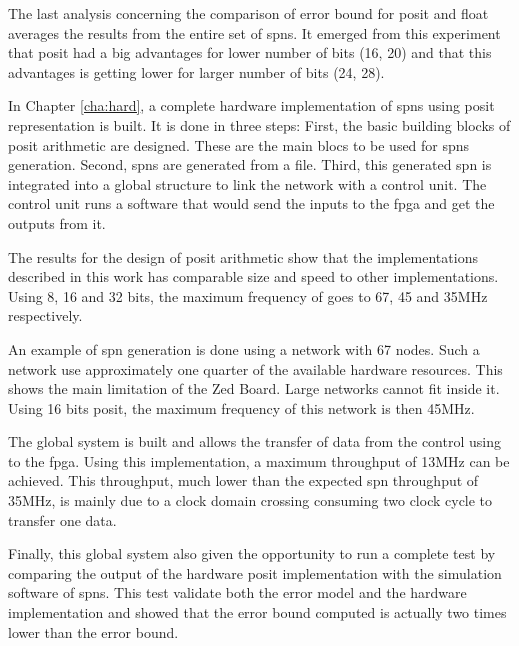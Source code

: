 The last analysis concerning the comparison of error bound for posit and float averages the results from the entire set of \glspl{spn}. It emerged from this experiment that posit had a big advantages for lower number of bits (16, 20) and that this advantages is getting lower for larger number of bits (24, 28).

\vspace{0.5cm}

In Chapter \ref{cha:hard}, a complete hardware implementation of \glspl{spn} using posit representation is built. It is done in three steps: First, the basic building blocks of posit arithmetic are designed. These are the main blocs to be used for \glspl{spn} generation. Second, \glspl{spn} are generated from a file. Third, this generated \gls{spn} is integrated into a global structure to link the network with a control unit. The control unit runs a software that would send the inputs to the \gls{fpga} and get the outputs from it.

The results for the design of posit arithmetic show that the implementations described in this work has comparable size and speed to other implementations. Using 8, 16 and 32 bits, the maximum frequency of goes to 67, 45 and 35MHz respectively.

An example of \gls{spn} generation is done using a network with 67 nodes. Such a network use approximately one quarter of the available hardware resources. This shows the main limitation of the Zed Board. Large networks cannot fit inside it. Using 16 bits posit, the maximum frequency of this network is then 45MHz.

The global system is built and allows the transfer of data from the control using to the \gls{fpga}. Using this implementation, a maximum throughput of 13MHz can be achieved. This throughput, much lower than the expected \gls{spn} throughput of 35MHz, is mainly due to a clock domain crossing consuming two clock cycle to transfer one data.

Finally, this global system also given the opportunity to run a complete test by comparing the output of the hardware posit implementation with the simulation software of \glspl{spn}. This test validate both the error model and the hardware implementation and showed that the error bound computed is actually two times lower than the error bound.
